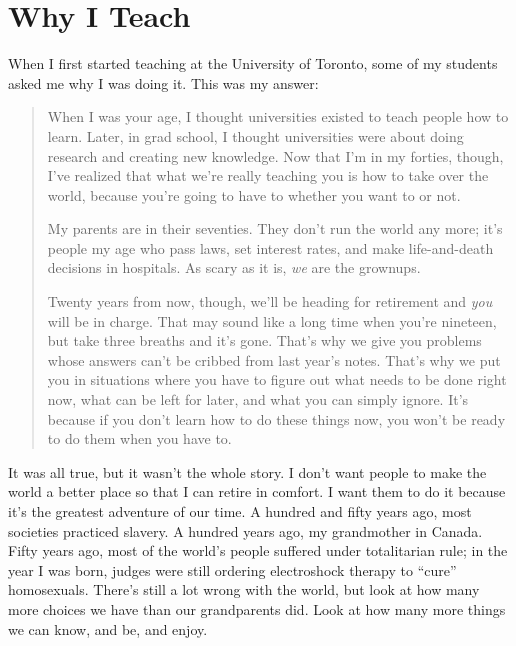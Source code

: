 \chapter{Why I Teach}\label{s:finale}

When I first started teaching at the University of Toronto, some of my
students asked me why I was doing it. This was my answer:

\begin{quote}

When I was your age, I thought universities existed to teach people
how to learn. Later, in grad school, I thought universities were about
doing research and creating new knowledge. Now that I'm in my forties,
though, I've realized that what we're really teaching you is how to
take over the world, because you're going to have to whether you want
to or not.

My parents are in their seventies. They don't run the world any more;
it's people my age who pass laws, set interest rates, and make
life-and-death decisions in hospitals. As scary as it is, \emph{we} are the
grownups.

Twenty years from now, though, we'll be heading for retirement and
\emph{you} will be in charge. That may sound like a long time when you're
nineteen, but take three breaths and it's gone. That's why we give you
problems whose answers can't be cribbed from last year's notes. That's
why we put you in situations where you have to figure out what needs
to be done right now, what can be left for later, and what you can
simply ignore. It's because if you don't learn how to do these things
now, you won't be ready to do them when you have to.

\end{quote}

It was all true, but it wasn't the whole story. I don't want people to
make the world a better place so that I can retire in comfort. I want
them to do it because it's the greatest adventure of our time. A
hundred and fifty years ago, most societies practiced slavery. A
hundred years ago, my grandmother  in Canada. Fifty years ago, most of the world's
people suffered under totalitarian rule; in the year I was born,
judges were still ordering electroshock therapy to ``cure''
homosexuals. There's still a lot wrong with the world, but look at how
many more choices we have than our grandparents did. Look at how many
more things we can know, and be, and enjoy.

